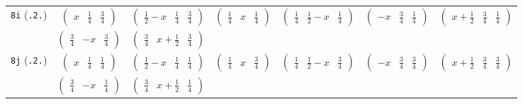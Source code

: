\documentclass[fleqn,9pt,landscape]{jsarticle}
\begin{document}
\begin{center}
\begin{longtable}{ccccccc}
{\tt 8i} ({\tt .2.}) & $ \begin{pmatrix} x & \frac{1}{4} & \frac{3}{4} \end{pmatrix} $ & $ \begin{pmatrix} \frac{1}{2} - x & \frac{1}{4} & \frac{3}{4} \end{pmatrix} $ & $ \begin{pmatrix} \frac{1}{4} & x & \frac{1}{4} \end{pmatrix} $ & $ \begin{pmatrix} \frac{1}{4} & \frac{1}{2} - x & \frac{1}{4} \end{pmatrix} $ & $ \begin{pmatrix} - x & \frac{3}{4} & \frac{1}{4} \end{pmatrix} $ & $ \begin{pmatrix} x + \frac{1}{2} & \frac{3}{4} & \frac{1}{4} \end{pmatrix} $ \\
& $ \begin{pmatrix} \frac{3}{4} & - x & \frac{3}{4} \end{pmatrix} $ & $ \begin{pmatrix} \frac{3}{4} & x + \frac{1}{2} & \frac{3}{4} \end{pmatrix} $ & $  $ & $  $ & $  $ & $  $ \\ \hline
{\tt 8j} ({\tt .2.}) & $ \begin{pmatrix} x & \frac{1}{4} & \frac{1}{4} \end{pmatrix} $ & $ \begin{pmatrix} \frac{1}{2} - x & \frac{1}{4} & \frac{1}{4} \end{pmatrix} $ & $ \begin{pmatrix} \frac{1}{4} & x & \frac{3}{4} \end{pmatrix} $ & $ \begin{pmatrix} \frac{1}{4} & \frac{1}{2} - x & \frac{3}{4} \end{pmatrix} $ & $ \begin{pmatrix} - x & \frac{3}{4} & \frac{3}{4} \end{pmatrix} $ & $ \begin{pmatrix} x + \frac{1}{2} & \frac{3}{4} & \frac{3}{4} \end{pmatrix} $ \\
& $ \begin{pmatrix} \frac{3}{4} & - x & \frac{1}{4} \end{pmatrix} $ & $ \begin{pmatrix} \frac{3}{4} & x + \frac{1}{2} & \frac{1}{4} \end{pmatrix} $ & $  $ & $  $ & $  $ & $  $ \\ \hline

\end{longtable}
\end{center}
\end{document}
